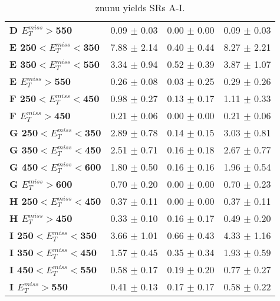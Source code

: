 \begin{table}[h]
\begin{center}
\begin{tabular}{|l|ccc|}
\textbf{ D $E_T^{miss}>$550}     & 0.09 $\pm$ 0.03       & 0.00 $\pm$ 0.00       & 0.09 $\pm$ 0.03       \\
\textbf{ E 250$<E_T^{miss}<$350}         & 7.88 $\pm$ 2.14       & 0.40 $\pm$ 0.44       & 8.27 $\pm$ 2.21       \\
\textbf{ E 350$<E_T^{miss}<$550}         & 3.34 $\pm$ 0.94       & 0.52 $\pm$ 0.39       & 3.87 $\pm$ 1.07       \\
\textbf{ E $E_T^{miss}>$550}     & 0.26 $\pm$ 0.08       & 0.03 $\pm$ 0.25       & 0.29 $\pm$ 0.26       \\
\textbf{ F 250$<E_T^{miss}<$450}         & 0.98 $\pm$ 0.27       & 0.13 $\pm$ 0.17       & 1.11 $\pm$ 0.33       \\
\textbf{ F $E_T^{miss}>$450}     & 0.21 $\pm$ 0.06       & 0.00 $\pm$ 0.00       & 0.21 $\pm$ 0.06       \\
\textbf{ G 250$<E_T^{miss}<$350}         & 2.89 $\pm$ 0.78       & 0.14 $\pm$ 0.15       & 3.03 $\pm$ 0.81       \\
\textbf{ G 350$<E_T^{miss}<$450}         & 2.51 $\pm$ 0.71       & 0.16 $\pm$ 0.18       & 2.67 $\pm$ 0.77       \\
\textbf{ G 450$<E_T^{miss}<$600}         & 1.80 $\pm$ 0.50       & 0.16 $\pm$ 0.16       & 1.96 $\pm$ 0.54       \\
\textbf{ G $E_T^{miss}>$600}     & 0.70 $\pm$ 0.20       & 0.00 $\pm$ 0.00       & 0.70 $\pm$ 0.23       \\
\textbf{ H 250$<E_T^{miss}<$450}         & 0.37 $\pm$ 0.11       & 0.00 $\pm$ 0.00       & 0.37 $\pm$ 0.11       \\
\textbf{ H $E_T^{miss}>$450}     & 0.33 $\pm$ 0.10       & 0.16 $\pm$ 0.17       & 0.49 $\pm$ 0.20       \\
\hline
\textbf{ I 250$<E_T^{miss}<$350}         & 3.66 $\pm$ 1.01       & 0.66 $\pm$ 0.43       & 4.33 $\pm$ 1.16       \\
\textbf{ I 350$<E_T^{miss}<$450}         & 1.57 $\pm$ 0.45       & 0.35 $\pm$ 0.34       & 1.93 $\pm$ 0.59       \\
\textbf{ I 450$<E_T^{miss}<$550}         & 0.58 $\pm$ 0.17       & 0.19 $\pm$ 0.20       & 0.77 $\pm$ 0.27       \\
\textbf{ I $E_T^{miss}>$550}     & 0.41 $\pm$ 0.13       & 0.17 $\pm$ 0.17       & 0.58 $\pm$ 0.22       \\
\hline
\end{tabular}
\caption[Table caption text]{znunu yields SRs A-I. }
\label{tab:YZnunu}
\end{center}
\end{table}


